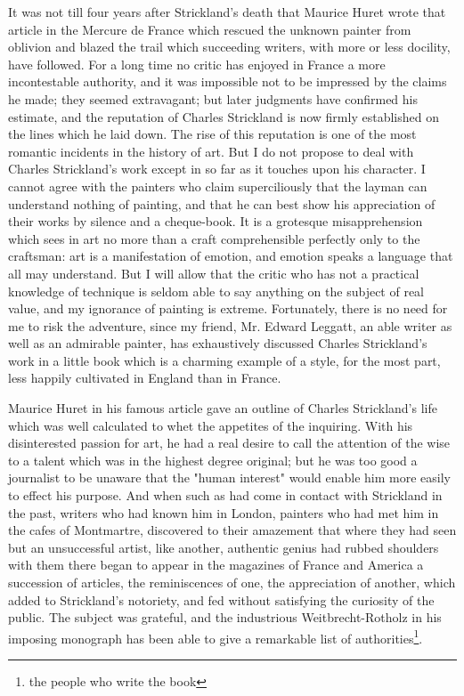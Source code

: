 \documentclass{article}
\begin{document}
  It was not till four years after Strickland's death that Maurice Huret wrote that article in the Mercure de France which rescued the unknown painter from oblivion and blazed the trail which succeeding writers, with more or less docility, have followed. For a long time no critic has enjoyed in France a more incontestable authority, and it was impossible not to be impressed by the claims he made; they seemed extravagant; but later judgments have confirmed his estimate, and the reputation of Charles Strickland is now firmly established on the lines which he laid down. The rise of this reputation is one of the most romantic incidents in the history of art. But I do not propose to deal with Charles Strickland's work except in so far as it touches upon his character. I cannot agree with the painters who claim superciliously that the layman can understand nothing of painting, and that he can best show his appreciation of their works by silence and a cheque-book. It is a grotesque misapprehension which sees in art no more than a craft comprehensible perfectly only to the craftsman: art is a manifestation of emotion, and emotion speaks a language that all may understand. But I will allow that the critic who has not a practical knowledge of technique is seldom able to say anything on the subject of real value, and my ignorance of painting is extreme. Fortunately, there is no need for me to risk the adventure, since my friend, Mr. Edward Leggatt, an able writer as well as an admirable painter, has exhaustively discussed Charles Strickland's work in a little book\cite{bib1} which is a charming example of a style, for the most part, less happily cultivated in England than in France.\par
  Maurice Huret in his famous article gave an outline of Charles Strickland's life which was well calculated to whet the appetites of the inquiring. With his disinterested passion for art, he had a real desire to call the attention of the wise to a talent which was in the highest degree original; but he was too good a journalist to be unaware that the "human interest" would enable him more easily to effect his purpose. And when such as had come in contact with Strickland in the past, writers who had known him in London, painters who had met him in the cafes of Montmartre, discovered to their amazement that where they had seen but an unsuccessful artist, like another, authentic genius had rubbed shoulders with them there began to appear in the magazines of France and America a succession of articles, the reminiscences of one, the appreciation of another, which added to Strickland's notoriety, and fed without satisfying the curiosity of the public. The subject was grateful, and the industrious Weitbrecht-Rotholz in his imposing monograph\cite{bib2} has been able to give a remarkable list of authorities\footnote{the people who write the book}.\par
\end{document}
